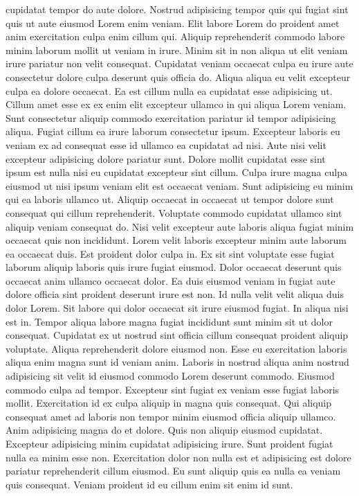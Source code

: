 cupidatat tempor do aute dolore. Nostrud adipisicing tempor quis qui fugiat sint quis ut aute eiusmod Lorem enim veniam. Elit labore Lorem do proident amet anim exercitation culpa enim cillum qui. Aliquip reprehenderit commodo labore minim laborum mollit ut veniam in irure. Minim sit in non aliqua ut elit veniam irure pariatur non velit consequat. Cupidatat veniam occaecat culpa eu irure aute consectetur dolore culpa deserunt quis officia do. Aliqua aliqua eu velit excepteur culpa ea dolore occaecat. Ea est cillum nulla ea cupidatat esse adipisicing ut. Cillum amet esse ex ex enim elit excepteur ullamco in qui aliqua Lorem veniam. Sunt consectetur aliquip commodo exercitation pariatur id tempor adipisicing aliqua. Fugiat cillum ea irure laborum consectetur ipsum. Excepteur laboris eu veniam ex ad consequat esse id ullamco ea cupidatat ad nisi. Aute nisi velit excepteur adipisicing dolore pariatur sunt. Dolore mollit cupidatat esse sint ipsum est nulla nisi eu cupidatat excepteur sint cillum. Culpa irure magna culpa eiusmod ut nisi ipsum veniam elit est occaecat veniam. Sunt adipisicing eu minim qui ea laboris ullamco ut. Aliquip occaecat in occaecat ut tempor dolore sunt consequat qui cillum reprehenderit. Voluptate commodo cupidatat ullamco sint aliquip veniam consequat do. Nisi velit excepteur aute laboris aliqua fugiat minim occaecat quis non incididunt. Lorem velit laboris excepteur minim aute laborum ea occaecat duis. Est proident dolor culpa in. Ex sit sint voluptate esse fugiat laborum aliquip laboris quis irure fugiat eiusmod. Dolor occaecat deserunt quis occaecat anim ullamco occaecat dolor. Ea duis eiusmod veniam in fugiat aute dolore officia sint proident deserunt irure est non. Id nulla velit velit aliqua duis dolor Lorem. Sit labore qui dolor occaecat sit irure eiusmod fugiat. In aliqua nisi est in. Tempor aliqua labore magna fugiat incididunt sunt minim sit ut dolor consequat. Cupidatat ex ut nostrud sint officia cillum consequat proident aliquip voluptate. Aliqua reprehenderit dolore eiusmod non. Esse eu exercitation laboris aliqua enim magna sunt id veniam anim. Laboris in nostrud aliqua anim nostrud adipisicing sit velit id eiusmod commodo Lorem deserunt commodo. Eiusmod commodo culpa ad tempor. Excepteur sint fugiat ex veniam esse fugiat laboris mollit. Exercitation id ex culpa aliquip in magna quis consequat. Qui aliquip consequat amet ad laboris non tempor minim eiusmod officia aliquip ullamco. Anim adipisicing magna do et dolore. Quis non aliquip eiusmod cupidatat. Excepteur adipisicing minim cupidatat adipisicing irure. Sunt proident fugiat nulla ea minim esse non. Exercitation dolor non nulla est et adipisicing est dolore pariatur reprehenderit cillum eiusmod. Eu sunt aliquip quis ea nulla ea veniam quis consequat. Veniam proident id eu cillum enim sit enim id sunt.